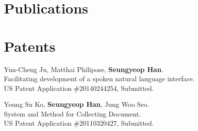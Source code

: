 \documentclass[margin,line]{res}
\makeatletter
\renewenvironment{thebibliography}[1]
     {\list{\@biblabel{\@arabic\c@enumiv}}%
           {\settowidth\labelwidth{\@biblabel{#1}}%
            \leftmargin\labelwidth
            \advance\leftmargin\labelsep
            \@openbib@code
            \usecounter{enumiv}%
            \let\p@enumiv\@empty
            \renewcommand\theenumiv{\@arabic\c@enumiv}}%
      \sloppy
      \clubpenalty4000
      \@clubpenalty \clubpenalty
      \widowpenalty4000%
      \sfcode`\.\@m}
     {\def\@noitemerr
       {\@latex@warning{Empty `thebibliography' environment}}%
      \endlist}
\makeatother
\begin{document}
\begin{resume}
\section{\sc Publications}
\nocite{*}



\begin{comment}
\section{\sc Working Papers}
\begin{thebibliography}{10}
\bibitem{toip2}
Haewoon Kwak, \textbf{Seungyeop Han}
\newblock So Many Bad Guys, So Little Time: Exploring Crowdsourcing Frameworks for Combating Toxic Players in Online Games.
\newblock Under Submission.

\bibitem{toip2}
Vincent Liu, \textbf{Seungyeop Han}, Adam Lerner, Arvind Krishnamurthy, Thomas Anderson. 
\newblock Internet Privacy by Construction. 
\newblock Tech Report UW-CSE-12-09-04, 2012.


\bibitem{applog}
\textbf{Seungyeop Han}, Jaeyeon Jung, and David Wetherall.
\newblock A study of third-party tracking by mobile apps in the wild.
\newblock Tech Report UW-CSE-12-03-01, 2012.

\end{thebibliography}
\end{comment}

\section{\sc Patents}
Yun-Cheng Ju, Matthai Philipose, \textbf{Seungyeop Han}. \\
Facilitating development of a spoken natural language interface. \\
US Patent Application \#20140244254, Submitted. 

Young Su Ko, \textbf{Seungyeop Han}, Jung Woo Seo. \\
System and Method for Collecting Document. \\
US Patent Application \#20110320427, Submitted. 


\end{resume}
\end{document}
